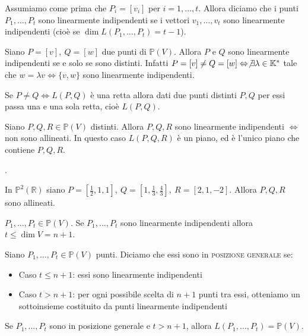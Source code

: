 \begin{defn}
Assumiamo come prima che $P_i=[v_i]$ per $i=1,\dots,t$. Allora diciamo che i punti $P_1,\dots,P_t$ sono linearmente indipendenti se i vettori $v_1,\dots,v_t$ sono linearmente indipendenti (cioè se $\dim L(P_1,\dots,P_t)=t-1$).
\end{defn}

\begin{oss}
  \begin{nlist}
	\item Siano $P=[v],\ Q=[w]$ due punti di $\mathbb{P}(V)$. Allora $P$ e $Q$ sono linearmente indipendenti se e solo se sono 				distinti. Infatti $P=[v]\neq Q=[w] \Leftrightarrow \not\exists \lambda \in \mathbb{K}^*$ tale che $w=\lambda v \Leftrightarrow \{v,w\}$ sono linearmente indipendenti.
	\item Se $P \neq Q \Leftrightarrow L(P,Q)$ è una retta allora dati due punti distinti $P,Q$ per essi passa una e una sola retta, cioè 		$L(P,Q)$.
	\item Siano $P,Q,R \in \mathbb{P}(V)$ distinti. Allora $P,Q,R$ sono linearmente indipendenti $\Leftrightarrow$ non sono allineati. 	In questo caso $L(P,Q,R)$ è un piano, ed è l'unico piano che contiene $P,Q,R$.
  \end{nlist}.
\end{oss}

\begin{ex}
In $\mathbb{P}^2(\mathbb{R})$ siano $P=[\frac{1}{2},1,1],\ Q=[1,\frac{1}{3},\frac{4}{3}],\ R=[2,1,-2]$. Allora $P,Q,R$ sono allineati.
\end{ex}

\begin{oss}
$P_1,\dots,P_t \in \mathbb{P}(V)$. Se $P_1,\dots,P_t$ sono linearmente indipendenti allora $t \le \dim V=n+1$.
\end{oss}

\begin{defn}
Siano $P_1,\dots,P_t \in \mathbb{P}(V)$ punti. Diciamo che essi sono in \textsc{posizione generale} se:
\begin{itemize}
	\item Caso $t \le n+1$: essi sono linearmente indipendenti
	\item Caso $t>n+1$: per ogni possibile scelta di $n+1$ punti tra essi, otteniamo un sottoinsieme costituito da punti linearmente 		indipendenti
\end{itemize}
\end{defn}

\begin{oss}
Se $P_1,\dots,P_t$ sono in posizione generale e $t>n+1$, allora $L(P_1,\dots,P_t)=\mathbb{P}(V)$.
\end{oss}

